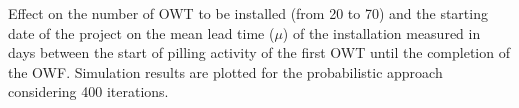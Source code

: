 \label{fig:effectnumber}
Effect on the number of OWT to be installed (from 20 to 70) and the starting date of the project on the mean lead time ($\mu$) of the installation measured in days between the start of pilling activity of the first OWT until the completion of the OWF. Simulation results are plotted for the probabilistic approach considering 400 iterations.